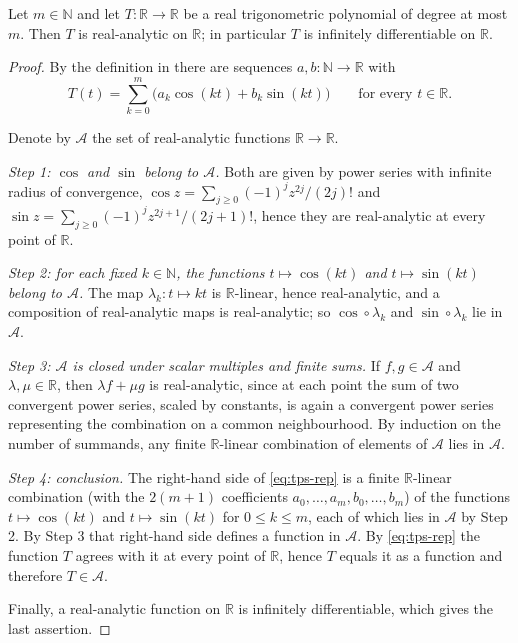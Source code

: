 \begin{lemma}
Let $m\in\mathbb{N}$ and let $T:\mathbb{R}\to\mathbb{R}$ be a real
trigonometric polynomial of degree at most $m$. Then $T$ is real-analytic on
$\mathbb{R}$; in particular $T$ is infinitely differentiable on $\mathbb{R}$.
\end{lemma}
\begin{proof}
By the definition in  there are sequences
$a,b:\mathbb{N}\to\mathbb{R}$ with
\begin{equation}\label{eq:tps-rep}
  T(t)=\sum_{k=0}^{m}\bigl(a_k\cos(kt)+b_k\sin(kt)\bigr)
  \qquad\text{for every }t\in\mathbb{R}.
\end{equation}

Denote by $\mathcal{A}$ the set of real-analytic functions $\mathbb{R}\to\mathbb{R}$.

\emph{Step 1: $\cos$ and $\sin$ belong to $\mathcal{A}$.} Both are given by
power series with infinite radius of convergence,
$\cos z=\sum_{j\ge0}(-1)^jz^{2j}/(2j)!$ and
$\sin z=\sum_{j\ge0}(-1)^jz^{2j+1}/(2j+1)!$, hence they are real-analytic at
every point of $\mathbb{R}$.

\emph{Step 2: for each fixed $k\in\mathbb{N}$, the functions
$t\mapsto\cos(kt)$ and $t\mapsto\sin(kt)$ belong to $\mathcal{A}$.} The map
$\lambda_k:t\mapsto kt$ is $\mathbb{R}$-linear, hence real-analytic, and a
composition of real-analytic maps is real-analytic; so
$\cos\circ\lambda_k$ and $\sin\circ\lambda_k$ lie in $\mathcal{A}$.

\emph{Step 3: $\mathcal{A}$ is closed under scalar multiples and finite sums.}
If $f,g\in\mathcal{A}$ and $\lambda,\mu\in\mathbb{R}$, then $\lambda f+\mu g$ is
real-analytic, since at each point the sum of two convergent power series,
scaled by constants, is again a convergent power series representing the
combination on a common neighbourhood. By induction on the number of summands,
any finite $\mathbb{R}$-linear combination of elements of $\mathcal{A}$ lies in
$\mathcal{A}$.

\emph{Step 4: conclusion.} The right-hand side of \eqref{eq:tps-rep} is a finite
$\mathbb{R}$-linear combination (with the $2(m+1)$ coefficients
$a_0,\dots,a_m,b_0,\dots,b_m$) of the functions $t\mapsto\cos(kt)$ and
$t\mapsto\sin(kt)$ for $0\le k\le m$, each of which lies in $\mathcal{A}$ by
Step 2. By Step 3 that right-hand side defines a function in $\mathcal{A}$. By
\eqref{eq:tps-rep} the function $T$ agrees with it at every point of
$\mathbb{R}$, hence $T$ equals it as a function and therefore $T\in\mathcal{A}$.

Finally, a real-analytic function on $\mathbb{R}$ is infinitely differentiable,
which gives the last assertion.
\end{proof}
